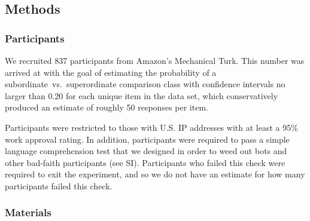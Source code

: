 \documentclass[doc, floatsintext]{apa6}
\newcommand{\red}[1]{\textcolor{Red}{#1}}
\begin{document}









\subsection{Methods}

\subsubsection{Participants}

We recruited 837 participants from Amazon's Mechanical Turk.
This number was arrived at with the goal of estimating the probability of a subordinate~vs.~superordinate comparison class with confidence intervals no larger than 0.20 for each unique item in the data set, which conservatively produced an estimate of roughly 50 responses per item.

Participants were restricted to those with U.S. IP addresses with at least a 95\% work approval rating.
In addition, participants were required to pass a simple language comprehension test that we designed in order to weed out bots and other bad-faith participants (see SI).
Participants who failed this check were required to exit the experiment, and so we do not have an estimate for how many participants failed this check.


\subsubsection{Materials}
\end{document}
